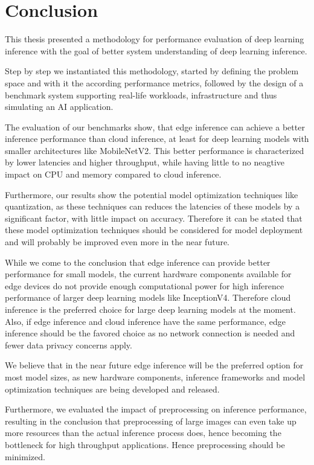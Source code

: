 \chapter{Conclusion}
\label{chap:conclusion}
%
This thesis presented a methodology for performance evaluation of deep learning inference with the goal of better system understanding of deep learning inference.

Step by step we instantiated this methodology, started by defining the problem space and with it the according performance metrics, followed by the design of a benchmark system supporting real-life workloads, infrastructure and thus simulating an AI application.

The evaluation of our benchmarks show, that edge inference can achieve a better inference performance than cloud inference, at least for deep learning models with smaller architectures like MobileNetV2.
This better performance is characterized by lower latencies and higher throughput, while having little to no neagtive impact on CPU and memory compared to cloud inference.

Furthermore, our results show the potential model optimization techniques like quantization, as these techniques can reduces the latencies of these models by a significant factor, with little impact on accuracy.
Therefore it can be stated that these model optimization techniques should be considered for model deployment and will probably be improved even more in the near future.

While we come to the conclusion that edge inference can provide better performance for small models, the current hardware components available for edge devices do not provide enough computational power for high inference performance of larger deep learning models like InceptionV4.
Therefore cloud inference is the preferred choice for large deep learning models at the moment.
Also, if edge inference and cloud inference have the same performance, edge inference should be the favored choice as no network connection is needed and fewer data privacy concerns apply.

We believe that in the near future edge inference will be the preferred option for most model sizes, as new hardware components, inference frameworks and model optimization techniques are being developed and released.

Furthermore, we evaluated the impact of preprocessing on inference performance, resulting in the conclusion that preprocessing of large images can even take up more resources than the actual inference process does, hence becoming the bottleneck for high throughput applications.
Hence preprocessing should be minimized.

